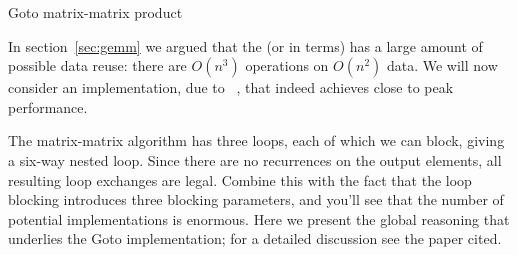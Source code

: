 
 {Goto matrix-matrix product}
\label{sec:goto-gemm}

In section~\ref{sec:gemm} we argued that the  (or  in  terms) has a large amount of
possible data reuse: there are $O(n^3)$ operations on $O(n^2)$ data.
We will now consider an implementation, due
to ~\cite{GotoGeijn:2008:Anatomy}, that
indeed achieves close to peak performance.

The matrix-matrix algorithm has three loops, each of which we can block,
giving a six-way nested loop.
Since there are no recurrences on the output elements, all resulting
loop exchanges are legal. Combine this with the fact that the loop blocking
introduces three blocking parameters, and you'll see that the number of
potential implementations is enormous. Here we present the global reasoning
that underlies the Goto implementation; for a detailed discussion see the paper cited.


